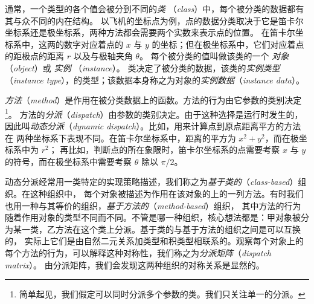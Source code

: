 通常，一个类型的各个值会被分到不同的\textit{类} （\textit{class}）中，每个被分类的数据都有其与众不同的内在结构。
以飞机的坐标点为例，点的数据分类取决于它是笛卡尔坐标系还是极坐标系，两种方法都会需要两个实数来表示点的位置。
在笛卡尔坐标系中，这两的数字对应着点的 $ x $ 与 $ y $ 的坐标；但在极坐标系中，它们对应着点的距极点的距离 $ r $ 以及与极轴夹角 $ \theta $。
每个被分类的值叫做该类的一个 \textit{对象}（\textit{object}）或 \textit{实例} （\textit{instance}）。
类决定了被分类的数据，该类的\textit{实例类型}（\textit{instance type}），的类型；该数据本身称之为对象的\textit{实例数据}（\textit{instance data}）。

\textit{方法}（\textit{method}）是作用在被分类数据上的函数。方法的行为由它参数的类别决定\footnote[1]{简单起见，我们假定可以同时分派多个参数的类。我们只关注单一的分派。}。
方法的\textit{分派}（\textit{dispatch}）由参数的类别决定。由于这种选择是运行时发生的，
因此叫\textit{动态分派}（\textit{dynamic dispatch}）。比如，用来计算点到原点距离平方的方法在
两种坐标系下表现不同。在笛卡尔坐标系中，距离的平方为 $x^2 + y^2$，而在极坐标系中为 $r^2$；
再比如，判断点的所在象限时，笛卡尔坐标系的点需要考察 $ x $ 与 $ y $ 的符号，而在极坐标系中需要考察 $ \theta $ 除以 $ \pi / 2 $。

动态分派经常用一类特定的实现策略描述，我们称之为\textit{基于类的}（\textit{class-based}）组织。在这种组织中，
每个对象被描述为作用在该对象的上的一列方法。有时我们也用一种与其等价的组织，\textit{基于方法的}（\textit{method-based}）组织，
其中方法的行为随着作用对象的类型不同而不同。不管是哪一种组织，核心想法都是：甲对象被分为某一类，乙方法在这个类上分派。基于类的与基于方法的组织之间是可以互换的，
实际上它们是由自然二元关系加类型和积类型相联系的。观察每个对象上的每个方法的行为，可以解释这种对称性，我们称之为\textit{分派矩阵}（\textit{dispatch matrix}）。
由分派矩阵，我们会发现这两种组织的对称关系是显然的。
